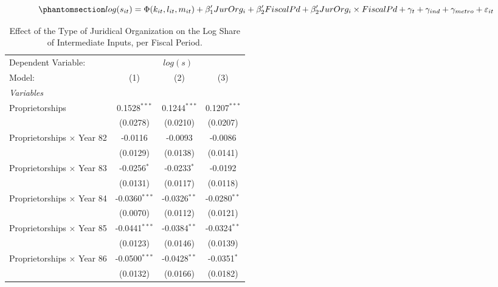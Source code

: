 \documentclass[
  12pt]{article}
\begin{document}
\begin{equation}\phantomsection\label{eq-reg-tax-fp}{
log(s_{it})= \Phi(k_{it},l_{it},m_{it})+ \beta_1'JurOrg_i + \beta_2'FiscalPd+\beta_2'JurOrg_i\times FiscalPd + \gamma_t + \gamma_{ind} +\gamma_{metro} + \varepsilon_{it}
}\end{equation}

\begin{table}

\caption{\label{tbl-reg-fiscal-p}Effect of the Type of Juridical
Organization on the Log Share of Intermediate Inputs, per Fiscal
Period.}

\begin{minipage}{\linewidth}

\begingroup
\centering
\begin{tabular}{lccc}
   \tabularnewline \midrule \midrule
   Dependent Variable: & \multicolumn{3}{c}{\(log(s)\)}\\
   Model:                            & (1)             & (2)            & (3)\\  
   \midrule
   \emph{Variables}\\
   Proprietorships                   & 0.1528$^{***}$  & 0.1244$^{***}$ & 0.1207$^{***}$\\   
                                     & (0.0278)        & (0.0210)       & (0.0207)\\   
   Proprietorships $\times$ Year 82  & -0.0116         & -0.0093        & -0.0086\\   
                                     & (0.0129)        & (0.0138)       & (0.0141)\\   
   Proprietorships $\times$ Year 83  & -0.0256$^{*}$   & -0.0233$^{*}$  & -0.0192\\   
                                     & (0.0131)        & (0.0117)       & (0.0118)\\   
   Proprietorships $\times$ Year 84  & -0.0360$^{***}$ & -0.0326$^{**}$ & -0.0280$^{**}$\\   
                                     & (0.0070)        & (0.0112)       & (0.0121)\\   
   Proprietorships $\times$ Year 85  & -0.0441$^{***}$ & -0.0384$^{**}$ & -0.0324$^{**}$\\   
                                     & (0.0123)        & (0.0146)       & (0.0139)\\   
   Proprietorships $\times$ Year 86  & -0.0500$^{***}$ & -0.0428$^{**}$ & -0.0351$^{*}$\\   
                                     & (0.0132)        & (0.0166)       & (0.0182)\\   

\end{tabular}
\end{minipage}
\end{table}
\end{document}
